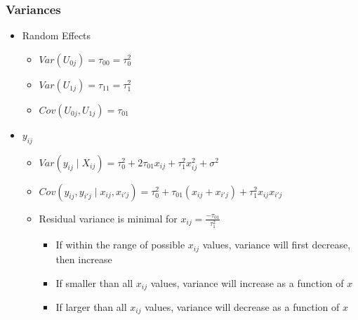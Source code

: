\documentclass{beamer}
\begin{document}
\begin{frame}
	\frametitle{Variances}
		\begin{itemize}
			\item Random Effects
				\begin{itemize}
					\item $Var(U_{0j})=\tau_{00}=\tau_{0}^{2}$
					\item $Var(U_{1j})=\tau_{11}=\tau_{1}^{2}$
					\item $Cov(U_{0j},U_{1j})=\tau_{01}$
				\end{itemize}
			\item $y_{ij}$
				\begin{itemize}
					\item $Var(y_{ij}\mid X_{ij})=\tau_{0}^{2}+2\tau_{01}x_{ij}+\tau_{1}^{2}x_{ij}^{2}+\sigma^{2}$
					\item $Cov(y_{ij},y_{i'j}\mid x_{ij},x_{i'j})=\tau^{2}_{0}+\tau_{01}(x_{ij}+x_{i'j})+\tau_{1}^{2}x_{ij}x_{i'j}$
					\item Residual variance is minimal for $x_{ij}=\frac{-\tau_{01}}{\tau_{1}^{2}}$
						\begin{itemize}
							\item If within the range of possible $x_{ij}$ values, variance will first decrease, then increase
							\item If smaller than all $x_{ij}$ values, variance will increase as a function of $x$
							\item If larger than all $x_{ij}$ values, variance will decrease as a function of $x$
						\end{itemize}
				\end{itemize}
		\end{itemize}
\end{frame}
\end{document}
